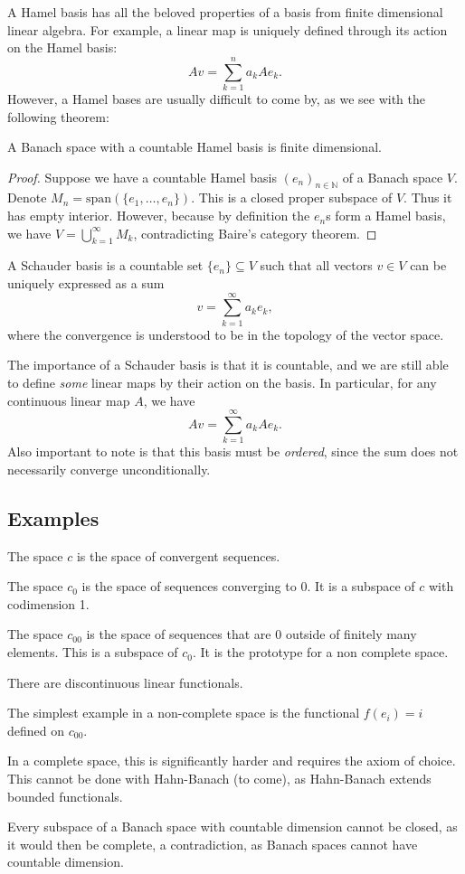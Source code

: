 \documentclass[twoside,symmetric, openany, 12pt]{./tuftebook}
\theoremstyle{definition}
\theoremstyle{definition}
\theoremstyle{definition}
\newcommand{\N}{\mathbb{N}}
\begin{document}
	A Hamel basis has all the beloved properties of a basis from finite dimensional linear algebra. For example, a linear map is uniquely defined through its action on the Hamel basis:
	\[Av = \sum_{k=1}^n a_k Ae_k.\]
	However, a Hamel bases are usually difficult to come by, as we see with the following theorem:
	\begin{Theorem}
		A Banach space with a countable Hamel basis is finite dimensional. 
	\end{Theorem}
\begin{proof}
	Suppose we have a countable Hamel basis $(e_n)_{n\in \N}$ of a Banach space $V$. Denote $M_n=\text{span}(\{e_1, \dots, e_n\})$. This is a closed proper subspace of $V$. Thus it has empty interior. However, because by definition the $e_n$s form a Hamel basis, we have $V=\bigcup_{k=1}^\infty M_k$, contradicting Baire's category theorem.
\end{proof}
	\begin{Definition}
		A Schauder basis is a countable set $\{e_n\}\subseteq V$ such that all vectors $v\in V$ can be uniquely expressed as a sum
		\[v=\sum_{k=1}^\infty a_k e_k,\]
		where the convergence is understood to be in the topology of the vector space. 
	\end{Definition}
The importance of a Schauder basis is that it is countable, and we are still able to define \emph{some} linear maps by their action on the basis. In particular, for any continuous linear map $A$, we have
\[Av = \sum_{k=1}^\infty a_k Ae_k.\]
Also important to note is that this basis must be \emph{ordered}, since the sum does not necessarily converge unconditionally. 
\subsection{Examples}
\begin{Example}
	The space $c$ is the space of convergent sequences.
\end{Example}
\begin{Example}
	The space $c_0$ is the space of sequences converging to 0. It is a subspace of $c$ with codimension 1.
\end{Example}
\begin{Example}
	The space $c_{00}$ is the space of sequences that are 0 outside of finitely many elements. This is a subspace of $c_0$. It is the prototype for a non complete space. 
\end{Example}
\begin{Example}
	There are discontinuous linear functionals.
	
	The simplest example in a non-complete space is the functional $f(e_i)=i$ defined on $c_{00}$. 
	
	In a complete space, this is significantly harder and requires the axiom of choice. This cannot be done with Hahn-Banach (to come), as Hahn-Banach extends bounded functionals. 
\end{Example}
\begin{Example}
	Every subspace of a Banach space with countable dimension cannot be closed, as it would then be complete, a contradiction, as Banach spaces cannot have countable dimension. 
\end{Example}
\end{document}
